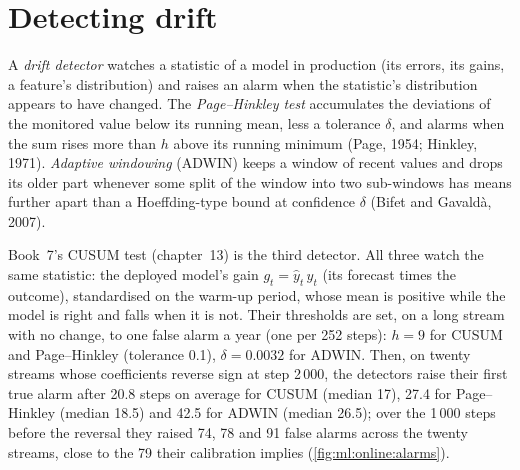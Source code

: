 \section{Detecting drift}

\begin{definition}\label{def:ml:online-learning-and-drift:detector}
A \emph{drift detector} watches a statistic of a model in production (its errors, its gains, a
feature's distribution) and raises an alarm when the statistic's distribution appears to have changed. The
\emph{Page--Hinkley test} accumulates the deviations of the monitored value below its running mean,
less a tolerance $\delta$, and alarms when the sum rises more than $h$ above its running minimum (Page, 1954; Hinkley, 1971).
\emph{Adaptive windowing} (ADWIN) keeps a window of recent values and drops its older part whenever
some split of the window into two sub-windows has means further apart than a Hoeffding-type bound at confidence $\delta$
(Bifet and Gavaldà, 2007).
\end{definition}

Book~7's CUSUM test (chapter~13) is the third detector. All three watch the same statistic: the deployed model's gain
$g_t = \hat y_t\,y_t$ (its forecast times the outcome), standardised on the warm-up period, whose mean is positive while the
model is right and falls when it is not. Their thresholds are set, on a long stream with no change, to one false alarm a
year (one per 252 steps): $h = 9$ for CUSUM and Page--Hinkley (tolerance 0.1), $\delta = 0.0032$ for ADWIN. Then, on twenty
streams whose coefficients reverse sign at step 2\,000, the detectors raise their first true alarm after 20.8 steps on
average for CUSUM (median 17), 27.4 for Page--Hinkley (median 18.5) and 42.5 for ADWIN (median 26.5); over the 1\,000 steps
before the reversal they raised 74, 78 and 91 false alarms across the twenty streams, close to the 79 their calibration
implies (\cref{fig:ml:online:alarms}).


